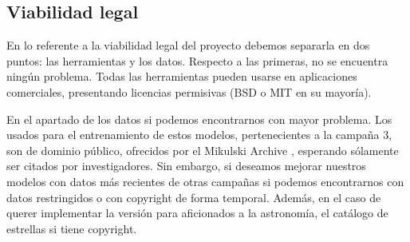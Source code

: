 \subsection{Viabilidad legal}

En lo referente a la viabilidad legal del proyecto debemos separarla en dos puntos: las herramientas y los datos. Respecto a las primeras, no se encuentra ningún problema. Todas las herramientas pueden usarse en aplicaciones comerciales, presentando licencias permisivas (BSD o MIT en su mayoría).

En el apartado de los datos si podemos encontrarnos con mayor problema. Los usados para el entrenamiento de estos modelos, pertenecientes a la campaña 3, son de dominio público, ofrecidos por el Mikulski Archive \cite{Mikulski-Archive}, esperando sólamente ser citados por investigadores. Sin embargo, si deseamos mejorar nuestros modelos con datos más recientes de otras campañas si podemos encontrarnos con datos restringidos o con copyright de forma temporal. Además, en el caso de querer implementar la versión para aficionados a la astronomía, el catálogo de estrellas si tiene copyright.
